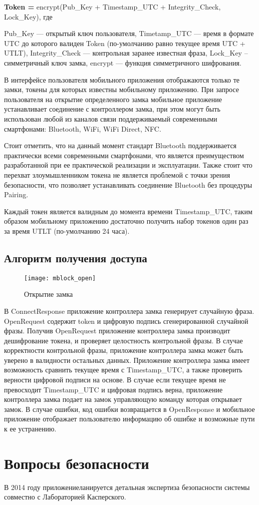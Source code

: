 \textbf{Token = }encrypt(Pub\_Key + Timestamp\_UTC + Integrity\_Check, Lock\_Key), где

\noindent Pub\_Key — открытый ключ пользователя, Timetamp\_UTC — время в формате UTC до которого валиден Token (по-умолчанию равно текущее время UTC + UTLT), Integrity\_Check — контрольная заранее известная фраза, Lock\_Key – симметричный ключ замка, encrypt — функция симметричного шифрования.

В интерфейсе пользователя мобильного приложения отображаются только те замки, токены для которых известны мобильному приложению. При запросе пользователя на открытие определенного замка мобильное приложение устанавливает соединение с контроллером замка, при этом могут быть использован любой из каналов связи поддерживаемый современными смартфонами: Bluetooth, WiFi, WiFi Direct, NFC.

Стоит отметить, что на данный момент стандарт Bluetooth поддерживается практически всеми современными смартфонами, что является преимуществом разработанной при ее практической реализации и эксплуатации. Также стоит что перехват злоумышленником токена не является проблемой с точки зрения безопасности, что позволяет устанавливать соединение Bluetooth без процедуры Pairing.

Каждый токен является валидным до момента времени Timestamp\_UTC, таким образом мобильному приложению достаточно получить набор токенов один раз за время UTLT (по-умолчанию 24 часа).

\subsection{Алгоритм получения доступа} \label{subsect2_4_3}

\begin{figure}[ht] %
	\centering
	\texttt{[image: mblock\_open]}\\ %
	\caption{Открытие замка}%
	\label{mblock_open}%
\end{figure}

В ConnectResponse приложение контроллера замка генерирует случайную фраза. OpenRequest содержит token и цифровую подпись сгенерированной случайной фразы. Получив OpenRequest приложение контроллера замка производит дешифрование токена, и проверяет целостность контрольной фразы. В случае корректности контрольной фразы, приложение контроллера замка может быть уверено в валидности остальных данных. Приложение контроллера замка имеет возможность сравнить текущее время с Timestamp\_UTC, а также проверить верности цифровой подписи на основе. В случае если текущее время не превосходит Timestamp\_UTC и цифровая подпись верна, приложение контроллера замка подает на замок управляющую команду которая открывает замок. В случае ошибки, код ошибки возвращается в OpenResponse и мобильное приложение отображает пользователю информацию об ошибке и возможные пути к ее устранению.

\section{Вопросы безопасности} \label{subsect2_5}
В 2014 году приложениеланируется детальная экспертиза безопасности системы совместно с Лабораторией Касперского.
\clearpage